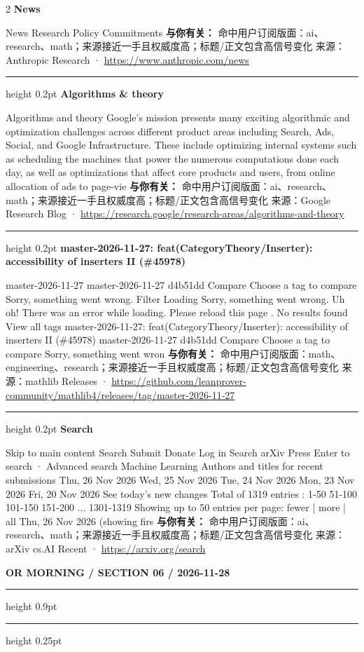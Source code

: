 \documentclass[10.5pt]{ctexart}
\begin{document}
\begin{multicols}{2}
{\large\bfseries News}\par
News Research Policy Commitments
\textbf{与你有关：} 命中用户订阅版面：ai、research、math；来源接近一手且权威度高；标题/正文包含高信号变化
{\footnotesize\color{ormuted} 来源：Anthropic Research · \url{https://www.anthropic.com/news}}
\vspace{2mm}
\hrule height 0.2pt
\vspace{2mm}
{\large\bfseries Algorithms \& theory}\par
Algorithms and theory Google’s mission presents many exciting algorithmic and optimization challenges across different product areas including Search, Ads, Social, and Google Infrastructure. These include optimizing internal systems such as scheduling the machines that power the numerous computations done each day, as well as optimizations that affect core products and users, from online allocation of ads to page-vie
\textbf{与你有关：} 命中用户订阅版面：ai、research、math；来源接近一手且权威度高；标题/正文包含高信号变化
{\footnotesize\color{ormuted} 来源：Google Research Blog · \url{https://research.google/research-areas/algorithms-and-theory}}
\vspace{2mm}
\hrule height 0.2pt
\vspace{2mm}
{\large\bfseries master-2026-11-27: feat(CategoryTheory/Inserter): accessibility of inserters II (\#45978)}\par
master-2026-11-27 master-2026-11-27 d4b51dd Compare Choose a tag to compare Sorry, something went wrong. Filter Loading Sorry, something went wrong. Uh oh! There was an error while loading. Please reload this page . No results found View all tags master-2026-11-27: feat(CategoryTheory/Inserter): accessibility of inserters II (\#45978) master-2026-11-27 d4b51dd Compare Choose a tag to compare Sorry, something went wron
\textbf{与你有关：} 命中用户订阅版面：math、engineering、research；来源接近一手且权威度高；标题/正文包含高信号变化
{\footnotesize\color{ormuted} 来源：mathlib Releases · \url{https://github.com/leanprover-community/mathlib4/releases/tag/master-2026-11-27}}
\vspace{2mm}
\hrule height 0.2pt
\vspace{2mm}
{\large\bfseries Search}\par
Skip to main content Search Submit Donate Log in Search arXiv Press Enter to search · Advanced search Machine Learning Authors and titles for recent submissions Thu, 26 Nov 2026 Wed, 25 Nov 2026 Tue, 24 Nov 2026 Mon, 23 Nov 2026 Fri, 20 Nov 2026 See today's new changes Total of 1319 entries : 1-50 51-100 101-150 151-200 ... 1301-1319 Showing up to 50 entries per page: fewer | more | all Thu, 26 Nov 2026 (showing firs
\textbf{与你有关：} 命中用户订阅版面：ai、research、math；来源接近一手且权威度高；标题/正文包含高信号变化
{\footnotesize\color{ormuted} 来源：arXiv cs.AI Recent · \url{https://arxiv.org/search}}
\end{multicols}
\newpage
{\small\bfseries OR MORNING / SECTION 06 / 2026-11-28}
\vspace{2mm}
\hrule height 0.9pt
\vspace{1.5mm}
\hrule height 0.25pt
\vspace{4mm}
\end{document}
